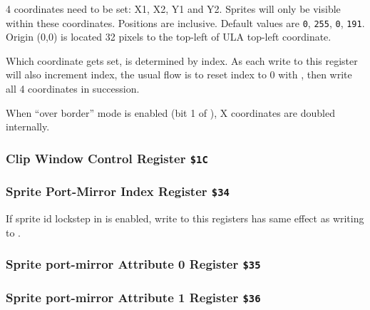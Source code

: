 \documentclass[12pt,twoside,openright,a4paper]{book}
\begin{document}
4 coordinates need to be set: X1, X2, Y1 and Y2. Sprites will only be visible within these coordinates. Positions are inclusive. Default values are {\tt 0}, {\tt 255}, {\tt 0}, {\tt 191}. Origin (0,0) is located 32 pixels to the top-left of ULA top-left coordinate.

Which coordinate gets set, is determined by index. As each write to this register will also increment index, the usual flow is to reset index to 0 with , then write all 4 coordinates in succession.

When ``over border'' mode is enabled (bit 1 of ), X coordinates are doubled internally.


\subsubsection{Clip Window Control Register {\tt \$1C}}



\subsubsection{Sprite Port-Mirror Index Register {\tt \$34}}

If sprite id lockstep in  is enabled, write to this registers has same effect as writing to .

\begin{NextPort}
\end{NextPort}


\subsubsection{Sprite port-mirror Attribute 0 Register {\tt \$35}}

\begin{NextPort}
\end{NextPort}


\subsubsection{Sprite port-mirror Attribute 1 Register {\tt \$36}}
\end{document}
